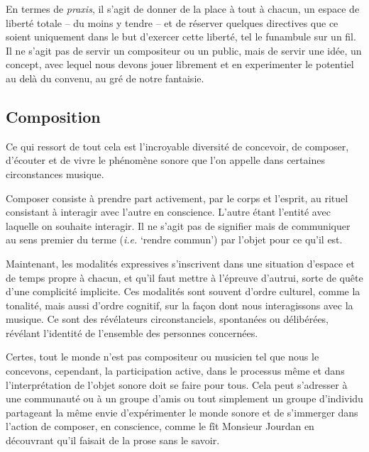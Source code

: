 \documentclass{article}
\begin{document}
\bigskip

En termes de \textit{praxis}, il s’agit de donner de la place à tout à chacun, un espace de liberté totale -- du moins y tendre -- et de réserver quelques directives que ce soient uniquement dans le but d’exercer cette liberté, tel le funambule sur un fil. Il ne s’agit pas de servir un compositeur ou un public, mais de servir une idée, un concept, avec lequel nous devons jouer librement et en experimenter le potentiel au delà du convenu, au gré de notre fantaisie.


\subsection{Composition} 

Ce qui ressort de tout cela est l'incroyable diversité de concevoir, de composer, d'écouter et de vivre le phénomène sonore que l'on appelle dans certaines circonstances musique.


Composer consiste à prendre part activement, par le corps et l'esprit, au rituel consistant à interagir avec l'autre en conscience. L'autre étant l'entité avec laquelle on souhaite interagir. Il ne s'agit pas de signifier mais de communiquer au sens premier du terme 
(\textit{i.e.} `rendre commun')
par l'objet pour ce qu'il est. 

Maintenant, les modalités expressives s'inscrivent dans une situation  d'espace et de temps propre à chacun, et qu'il faut mettre à l'épreuve d'autrui, sorte de quête d'une complicité implicite. Ces modalités sont souvent d'ordre culturel, comme la tonalité, mais aussi d'ordre cognitif, sur la façon dont nous interagissons avec la musique. Ce sont des révélateurs circonstanciels, spontanées ou délibérées, révélant l'identité de l'ensemble des personnes concernées. 

Certes, tout le monde n’est pas compositeur ou musicien tel que nous le concevons, cependant, la participation active, dans le processus même et dans l’interprétation de l’objet sonore doit se faire pour tous. 
Cela peut s'adresser à une communauté ou à un groupe d'amis ou tout simplement un groupe d'individu partageant la même envie d'expérimenter le monde sonore et de s'immerger dans l'action de composer,
en conscience, comme le fît  Monsieur Jourdan en découvrant qu'il faisait de la prose sans le savoir.
\end{document}
